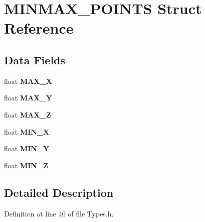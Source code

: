 \hypertarget{struct_m_i_n_m_a_x___p_o_i_n_t_s}{}\section{M\+I\+N\+M\+A\+X\+\_\+\+P\+O\+I\+N\+TS Struct Reference}
\label{struct_m_i_n_m_a_x___p_o_i_n_t_s}
\subsection*{Data Fields}
\begin{DoxyCompactItemize}
\item 
float {\bfseries M\+A\+X\+\_\+X}\hypertarget{struct_m_i_n_m_a_x___p_o_i_n_t_s_a6f3647bbc9d035aecb3d8361d2b63068}{}\label{struct_m_i_n_m_a_x___p_o_i_n_t_s_a6f3647bbc9d035aecb3d8361d2b63068}

\item 
float {\bfseries M\+A\+X\+\_\+Y}\hypertarget{struct_m_i_n_m_a_x___p_o_i_n_t_s_acf33b4e9ce1b9959f5277ae1837cd310}{}\label{struct_m_i_n_m_a_x___p_o_i_n_t_s_acf33b4e9ce1b9959f5277ae1837cd310}

\item 
float {\bfseries M\+A\+X\+\_\+Z}\hypertarget{struct_m_i_n_m_a_x___p_o_i_n_t_s_aad78df5b8e4560ec82ddef477c946029}{}\label{struct_m_i_n_m_a_x___p_o_i_n_t_s_aad78df5b8e4560ec82ddef477c946029}

\item 
float {\bfseries M\+I\+N\+\_\+X}\hypertarget{struct_m_i_n_m_a_x___p_o_i_n_t_s_adb26d6ffeb40bd27c31c4053efae7617}{}\label{struct_m_i_n_m_a_x___p_o_i_n_t_s_adb26d6ffeb40bd27c31c4053efae7617}

\item 
float {\bfseries M\+I\+N\+\_\+Y}\hypertarget{struct_m_i_n_m_a_x___p_o_i_n_t_s_a953cae776bec6fade1cfc958df763733}{}\label{struct_m_i_n_m_a_x___p_o_i_n_t_s_a953cae776bec6fade1cfc958df763733}

\item 
float {\bfseries M\+I\+N\+\_\+Z}\hypertarget{struct_m_i_n_m_a_x___p_o_i_n_t_s_a44dc28854d9543a021b2777b6b55fecf}{}\label{struct_m_i_n_m_a_x___p_o_i_n_t_s_a44dc28854d9543a021b2777b6b55fecf}

\end{DoxyCompactItemize}


\subsection{Detailed Description}


Definition at line 40 of file Types.\+h.

